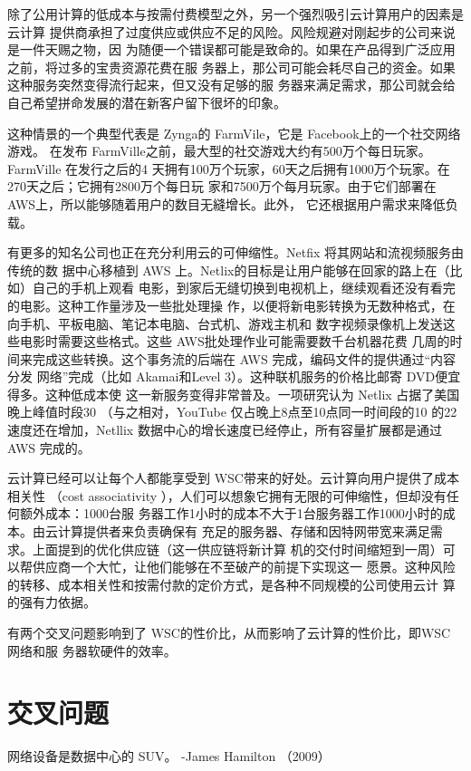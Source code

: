 除了公用计算的低成本与按需付费模型之外，另一个强烈吸引云计算用户的因素是云计算
提供商承担了过度供应或供应不足的风险。风险规避对刚起步的公司来说是一件天赐之物，因
为随便一个错误都可能是致命的。如果在产品得到广泛应用之前，将过多的宝贵资源花费在服
务器上，那公司可能会耗尽自己的资金。如果这种服务突然变得流行起来，但又没有足够的服
务器来满足需求，那公司就会给自己希望拼命发展的潜在新客户留下很坏的印象。

这种情景的一个典型代表是 Zynga的 FarmVile，它是 Facebook上的一个社交网络游戏。
在发布 FarmVille之前，最大型的社交游戏大约有500万个每日玩家。FarmVille 在发行之后的4
天拥有100万个玩家，60天之后拥有1000万个玩家。在270天之后；它拥有2800万个每日玩
家和7500万个每月玩家。由于它们部署在AWS上，所以能够随着用户的数目无縫增长。此外，
它还根据用户需求来降低负载。

有更多的知名公司也正在充分利用云的可伸缩性。Netfix 将其网站和流视频服务由传统的数
据中心移植到 AWS 上。Netlix的目标是让用户能够在回家的路上在（比如）自己的手机上观看
电影，到家后无缝切换到电视机上，继续观看还没有看完的电影。这种工作量涉及一些批处理操
作，以便将新电影转换为无数种格式，在向手机、平板电脑、笔记本电脑、台式机、游戏主机和
数字视频录像机上发送这些电影时需要这些格式。这些 AWS批处理作业可能需要数千台机器花费
几周的时间来完成这些转换。这个事务流的后端在 AWS 完成，编码文件的提供通过“内容分发
网络”完成（比如 Akamai和Level 3）。这种联机服务的价格比邮寄 DVD便宜得多。这种低成本使
这一新服务变得非常普及。一项研究认为 Netlix 占据了美国晚上峰值时段30%
（与之相对，YouTube 仅占晚上8点至10点同一时间段的10%
的22%
速度还在增加，Netllix 数据中心的增长速度已经停止，所有容量扩展都是通过 AWS 完成的。

云计算已经可以让每个人都能享受到 WSC带来的好处。云计算向用户提供了成本相关性
（cost associativity ），人们可以想象它拥有无限的可伸缩性，但却没有任何额外成本：1000台服
务器工作1小时的成本不大于1台服务器工作1000小时的成本。由云计算提供者来负责确保有
充足的服务器、存储和因特网带宽来满足需求。上面提到的优化供应链（这一供应链将新计算
机的交付时间缩短到一周）可以帮供应商一个大忙，让他们能够在不至破产的前提下实现这一
愿景。这种风险的转移、成本相关性和按需付款的定价方式，是各种不同规模的公司使用云计
算的强有力依据。

有两个交叉问题影响到了 WSC的性价比，从而影响了云计算的性价比，即WSC 网络和服
务器软硬件的效率。

\section{交叉问题}
网络设备是数据中心的 SUV。
-James Hamilton （2009）

